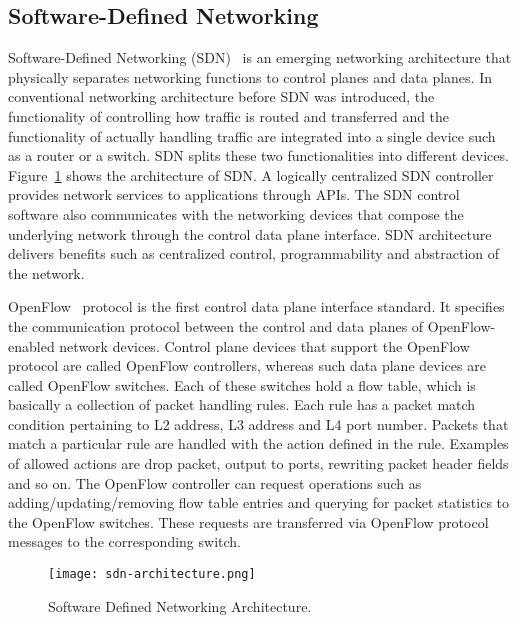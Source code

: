 \hypertarget{software-defined-networking}{%
\subsection{Software-Defined
Networking}\label{software-defined-networking}}

Software-Defined Networking (SDN)~\cite{sdn} is an emerging networking
architecture that physically separates networking functions to control
planes and data planes. In conventional networking architecture before
SDN was introduced, the functionality of controlling how traffic is
routed and transferred and the functionality of actually handling
traffic are integrated into a single device such as a router or a
switch. SDN splits these two functionalities into different devices.
Figure~\ref{fig-sdn-architecture} shows the architecture of SDN\@. A
logically centralized SDN controller provides network services to
applications through APIs. The SDN control software also communicates
with the networking devices that compose the underlying network through
the control data plane interface. SDN architecture delivers benefits
such as centralized control, programmability and abstraction of the
network.

OpenFlow~\cite{sdn} protocol is the first control data plane interface
standard. It specifies the communication protocol between the control
and data planes of OpenFlow-enabled network devices. Control plane
devices that support the OpenFlow protocol are called OpenFlow
controllers, whereas such data plane devices are called OpenFlow
switches. Each of these switches hold a flow table, which is basically a
collection of packet handling rules. Each rule has a packet match
condition pertaining to L2 address, L3 address and L4 port number.
Packets that match a particular rule are handled with the action defined
in the rule. Examples of allowed actions are drop packet, output to
ports, rewriting packet header fields and so on. The OpenFlow controller
can request operations such as adding/updating/removing flow table
entries and querying for packet statistics to the OpenFlow switches.
These requests are transferred via OpenFlow protocol messages to the
corresponding switch.

\begin{figure}[htbp]
    \centering
    \texttt{[image: sdn-architecture.png]}
    \caption{Software Defined Networking Architecture.}%
    \label{fig-sdn-architecture}
\end{figure}

